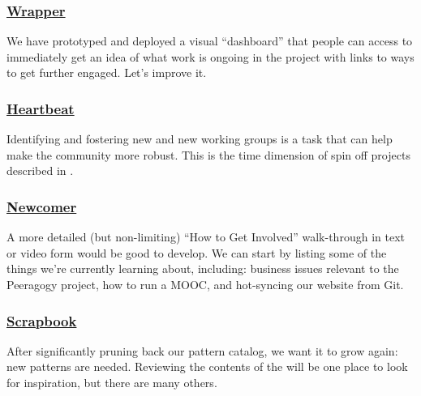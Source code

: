 \subsubsection*{\hyperref[sec:Wrapper]{Wrapper}}
We have prototyped and deployed a visual ``dashboard'' that people can access to immediately get an idea of what work is ongoing in the project with links to ways to get further engaged.  Let's improve it.

\subsubsection*{\hyperref[sec:Heartbeat]{Heartbeat}} Identifying and fostering new  and new working groups is a task that can help make the community more robust.  This is the time dimension of spin off projects described in .

\subsubsection*{\hyperref[sec:Newcomer]{Newcomer}} A more detailed (but non-limiting) ``How to Get Involved'' walk-through in text or video form would be good to develop. We can start by listing some of the things we're currently learning about, including: business issues relevant to the Peeragogy project, how to run a MOOC, and hot-syncing our website from Git.

\subsubsection*{\hyperref[sec:Scrapbook]{Scrapbook}} 
After significantly pruning back our pattern catalog, we want it to grow again: new patterns are needed.  Reviewing the contents of the  will be one place to look for inspiration, but there are many others.




